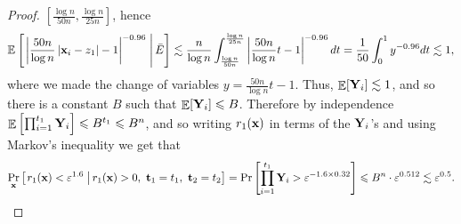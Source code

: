 \documentclass[10pt,a4paper]{article}
\newcommand\E{\mathop{\mathbb{E}}}
\newcommand\card[1]{\left| {#1} \right|}
\newcommand\cProb[3]{{\Pr_{#1}\left[ \left. #3 \;\right\vert #2 \right]}}
\newcommand\cExpect[3]{{\mathbb{E}_{#1}\left[ \left. #3 \;\right\vert #2 \right]}}
\newcommand\eps{\varepsilon}
\renewcommand\leq{\leqslant}
\newcommand{\ve}{\varepsilon}
\def\ll{\lesssim}
\begin{document}
\begin{proof}
  $\left[\frac{\log n}{50 n},\frac{\log n}{25 n}\right]$, hence
  \[
  \cExpect{}{\bar{E}}{\card{\frac{50n}{\log n}\card{{\bf x}_i - z_1} - 1}^{-0.96}}
  \ll\frac{n}{\log n}\int_{\frac{\log n}{50n}}^{\frac{\log n}{25n}}{\card{\frac{50n}{\log n}t - 1}^{-0.96} dt}
  =\frac{1}{50}\int_{0}^{1}{y^{-0.96} dt}
  \ll 1,
  \]
  where we made the change of variables $y = \frac{50n}{\log n}t - 1$.
  Thus, $\E[{\bf Y}_i] \ll 1$, and so there is a constant $B$ such that $\E[{\bf Y}_i]\leq B$.
  Therefore by independence $\E\left[\prod_{i=1}^{t_1} {\bf Y}_i\right]\leq B^{t_1}\leq B^n$,
  and so writing $r_1({\bf x})$ in terms of the ${\bf Y}_i$'s and using Markov's inequality we get that
  \[
    \cProb{{\bf x}}{r_1({\bf x})>0,~{\bf t}_1=t_1,~{\bf t}_2=t_2}{r_1({\bf x})<\ve^{1.6}}
    = \Pr\left[\prod_{i=1}^{t_1} {\bf Y}_i > \ve^{-1.6\times 0.32} \right] \leq B^n\cdot \ve^{0.512} \ll \eps^{0.5}.
  \qedhere
  \]
\end{proof}
\end{document}
